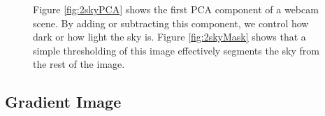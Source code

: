 		
\begin{figure}[ht]
	\centering
		\caption[Learning a sky mask for a webcam scene.]{Figure \ref{fig:2skyPCA} shows the first PCA component of a webcam scene.  By adding or subtracting this component, we control how dark or how light the sky is. Figure \ref{fig:2skyMask} shows that a simple thresholding of this image effectively segments the sky from the rest of the image.}\end{figure}
		
\subsection{Gradient Image}

